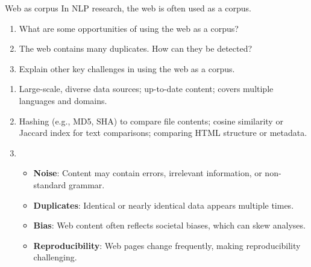 \documentclass{article}
\begin{document}
\begin{exercise}{Web as corpus}\label{ex:web-corpus}
  In NLP research, the web is often used as a corpus.
  \begin{enumerate}
    \item What are some opportunities of using the web as a corpus?
    \item The web contains many duplicates. How can they be detected?
    \item Explain other key challenges in using the web as a corpus.
  \end{enumerate}

  \begin{solution}
    \begin{enumerate}
      \item Large-scale, diverse data sources; up-to-date content; covers multiple languages and domains.
      \item Hashing (e.g., MD5, SHA) to compare file contents; cosine similarity or Jaccard index for text comparisons; comparing HTML structure or metadata.
      \item \begin{itemize}
          \item \textbf{Noise}: Content may contain errors, irrelevant information, or non-standard grammar.
          \item \textbf{Duplicates}: Identical or nearly identical data appears multiple times.
          \item \textbf{Bias}: Web content often reflects societal biases, which can skew analyses.
          \item \textbf{Reproducibility}: Web pages change frequently, making reproducibility challenging.
        \end{itemize}
    \end{enumerate}
  \end{solution}
\end{exercise}
\end{document}
